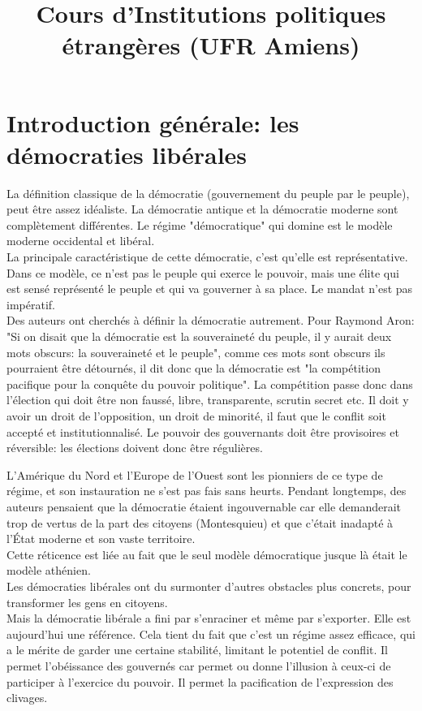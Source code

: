 \documentclass[10pt, a4paper, openany]{book}
\date{}
\title{Cours d'Institutions politiques étrangères (UFR Amiens)}
\begin{document}
\maketitle
\tableofcontents

\chapter{Introduction générale: les démocraties libérales}

La définition classique de la démocratie (gouvernement du peuple par le peuple), peut être assez idéaliste. La démocratie antique et la démocratie moderne sont complètement différentes. Le régime "démocratique" qui domine est le modèle moderne occidental et libéral. \\
La principale caractéristique de cette démocratie, c'est qu'elle est représentative. Dans ce modèle, ce n'est pas le peuple qui exerce le pouvoir, mais une élite qui est sensé représenté le peuple et qui va gouverner à sa place. Le mandat n'est pas impératif. \\
Des auteurs ont cherchés à définir la démocratie autrement. Pour Raymond Aron: "Si on disait que la démocratie est la souveraineté du peuple, il y aurait deux mots obscurs: la souveraineté et le peuple", comme ces mots sont obscurs ils pourraient être détournés, il dit donc que la démocratie est "la compétition pacifique pour la conquête du pouvoir politique". La compétition passe donc dans l'élection qui doit être non faussé, libre, transparente, scrutin secret etc. Il doit y avoir un droit de l'opposition, un droit de minorité, il faut que le conflit soit accepté et institutionnalisé. Le pouvoir des gouvernants doit être provisoires et réversible: les élections doivent donc être régulières.


L'Amérique du Nord et l'Europe de l'Ouest sont les pionniers de ce type de régime, et son instauration ne s'est pas fais sans heurts. Pendant longtemps, des auteurs pensaient que la démocratie étaient ingouvernable car elle demanderait trop de vertus de la part des citoyens (Montesquieu) et que c'était inadapté à l'État moderne et son vaste territoire. \\
Cette réticence est liée au fait que le seul modèle démocratique jusque là était le modèle athénien. \\
Les démocraties libérales ont du surmonter d'autres obstacles plus concrets, pour transformer les gens en citoyens. \\
Mais la démocratie libérale a fini par s'enraciner et même par s'exporter. Elle est aujourd'hui une référence. Cela tient du fait que c'est un régime assez efficace, qui a le mérite de garder une certaine stabilité, limitant le potentiel de conflit. Il permet l'obéissance des gouvernés car permet ou donne l'illusion à ceux-ci de participer à l'exercice du pouvoir. Il permet la pacification de l'expression des clivages. 
\end{document}

